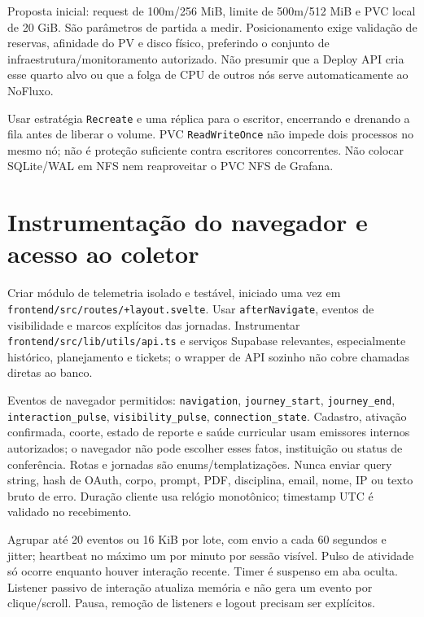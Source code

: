 \documentclass[10pt,a4paper]{article}
\begin{document}
Proposta inicial: request de 100m/256 MiB, limite de 500m/512 MiB e PVC
local de 20 GiB. São parâmetros de partida a medir. Posicionamento exige
validação de reservas, afinidade do PV e disco físico, preferindo o
conjunto de infraestrutura/monitoramento autorizado. Não presumir que a
Deploy API cria esse quarto alvo ou que a folga de CPU de outros nós
serve automaticamente ao NoFluxo.

Usar estratégia {\footnotesize\ttfamily\nolinkurl{Recreate}} e uma réplica para o escritor,
encerrando e drenando a fila antes de liberar o volume. PVC
{\footnotesize\ttfamily\nolinkurl{ReadWriteOnce}} não impede dois processos no mesmo nó; não é
proteção suficiente contra escritores concorrentes. Não colocar
SQLite/WAL em NFS nem reaproveitar o PVC NFS de Grafana.

\clearpage
\section{Instrumentação do navegador e acesso ao
coletor}\label{instrumentauxe7uxe3o-do-navegador-e-acesso-ao-coletor}

Criar módulo de telemetria isolado e testável, iniciado uma vez em
{\footnotesize\ttfamily\nolinkurl{frontend/src/routes/+layout.svelte}}. Usar
{\footnotesize\ttfamily\nolinkurl{afterNavigate}}, eventos de visibilidade e marcos explícitos das
jornadas. Instrumentar {\footnotesize\ttfamily\nolinkurl{frontend/src/lib/utils/api.ts}} e serviços
Supabase relevantes, especialmente histórico, planejamento e tickets; o
wrapper de API sozinho não cobre chamadas diretas ao banco.

Eventos de navegador permitidos: {\footnotesize\ttfamily\nolinkurl{navigation}},
{\footnotesize\ttfamily\nolinkurl{journey_start}}, {\footnotesize\ttfamily\nolinkurl{journey_end}},
{\footnotesize\ttfamily\nolinkurl{interaction_pulse}}, {\footnotesize\ttfamily\nolinkurl{visibility_pulse}},
{\footnotesize\ttfamily\nolinkurl{connection_state}}. Cadastro, ativação confirmada, coorte,
estado de reporte e saúde curricular usam emissores internos
autorizados; o navegador não pode escolher esses fatos, instituição ou
status de conferência. Rotas e jornadas são enums/templatizações. Nunca
enviar query string, hash de OAuth, corpo, prompt, PDF, disciplina,
email, nome, IP ou texto bruto de erro. Duração cliente usa relógio
monotônico; timestamp UTC é validado no recebimento.

Agrupar até 20 eventos ou 16 KiB por lote, com envio a cada 60 segundos
e jitter; heartbeat no máximo um por minuto por sessão visível. Pulso de
atividade só ocorre enquanto houver interação recente. Timer é suspenso
em aba oculta. Listener passivo de interação atualiza memória e não gera
um evento por clique/scroll. Pausa, remoção de listeners e logout
precisam ser explícitos.
\end{document}
